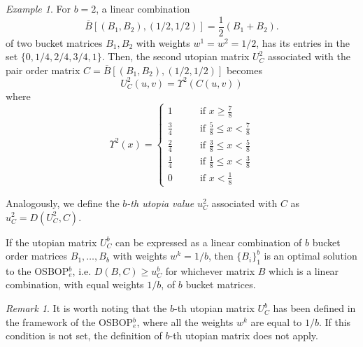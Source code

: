 \documentclass[preprint,12pt]{article}
\theoremstyle{definition}
\theoremstyle{remark}
\newtheorem{remark}{Remark}[section]
\theoremstyle{example} %
\newtheorem{example}{Example}[section]
\begin{document}
\begin{example}
For $b=2$, a linear combination  
\[
    \overline{B}[(B_1,B_2),(1/2,1/2)]=\frac{1}{2}(B_1+B_2).
\]
of two bucket matrices $B_1,B_2$ with weights $w^1=w^2=1/2$, has its entries in the set $\{0,1/4,2/4,3/4,1\}$. Then, the second utopian matrix $U_C^2$ associated with the pair order matrix $C=\overline{B}[(B_1,B_2),(1/2,1/2)]$ becomes
\[
U_C^2(u,v)=\Upsilon^2(C(u,v))
\]
where
\[
\Upsilon^2(x)=\left\{
\begin{array}{rl}
1 \qquad &  \mbox{if $x \geq \frac{7}{8}$} \\ [2mm]
\frac{3}{4} \qquad &  \mbox{if $\frac{5}{8}\leq x < \frac{7}{8}$} \\ [2mm]
\frac{2}{4} \qquad &  \mbox{if $\frac{3}{8}\leq x < \frac{5}{8}$} \\ [2mm]
\frac{1}{4} \qquad &  \mbox{if $\frac{1}{8}\leq x < \frac{3}{8}$} \\ [2mm]
0 \qquad &  \mbox{if $x < \frac{1}{8}$}
\end{array}
\right.
\]
\end{example}

Analogously, we define 
the \emph{$b$-th utopia value} $u_C^2$ associated with $C$ as $u_C^2=D(U_C^2,C)$. 

If the utopian matrix $U_C^b$ can be expressed as a linear combination of $b$ bucket order matrices $B_1,\dots,B_b$ with weights $w^k=1/b$, then $\{B_i\}^b_1$ is an optimal solution to the OSBOP$_e^b$, i.e. 
$D(B,C)\geq u_C^b$ for whichever matrix $B$ which is a linear combination, with equal weights $1/b$, of $b$ bucket matrices.

\begin{remark}
It is worth noting that the $b$-th utopian matrix $U_C^b$ has been defined in the framework of the {\rm OSBOP}$^b_e$, where all the weights $w^k$ are equal to $1/b$. If this condition is not set, the definition of $b$-th utopian matrix does not apply.
\end{remark}
\end{document}
